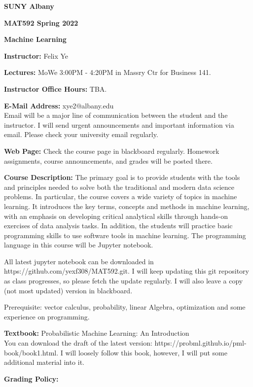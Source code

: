 \documentclass[a4paper,10pt]{article}
\begin{document}
\begin{center}

\textbf{SUNY Albany}

\textbf{MAT592 Spring 2022}

\textbf{Machine Learning}


\end{center}

\textbf{Instructor:} Felix Ye 

\textbf{Lectures:} MoWe 3:00PM - 4:20PM  in Massry Ctr for Business 141.

\textbf{Instructor Office Hours:} TBA.


\textbf{E-Mail Address:} xye2@albany.edu\\
Email will be a major line of communication between the student and the instructor. I will send urgent announcements and important information via email. Please check your university email regularly.

\textbf{Web Page:}
Check the course page in blackboard regularly. Homework assignments, course announcements, and grades will be posted there.


\textbf{Course Description:} The primary goal is to provide students with the tools and principles needed to solve both the traditional and modern data science problems. In particular, the course covers a wide variety of topics in machine learning. It introduces the key terms, concepts and methods in machine learning, with an emphasis on developing critical analytical skills through hands-on exercises of data analysis tasks. In addition, the students will practice basic programming skills to use software tools in machine learning. The programming language in this course will be Jupyter notebook. 

All latest jupyter notebook can be downloaded in https://github.com/yexf308/MAT592.git. I will keep updating this git repository as class progresses, so please fetch the update regularly. I will also leave a copy (not most updated) version in blackboard. 

 Prerequisite: vector calculus, probability, linear Algebra, optimization and some experience on programming. 
 

\textbf{Textbook:} Probabilistic Machine Learning: An Introduction \\
You can download the draft of the latest version: https://probml.github.io/pml-book/book1.html. 
 I will loosely follow this book, however, I will put some additional material into it.


\textbf{Grading Policy:}
\end{document}
